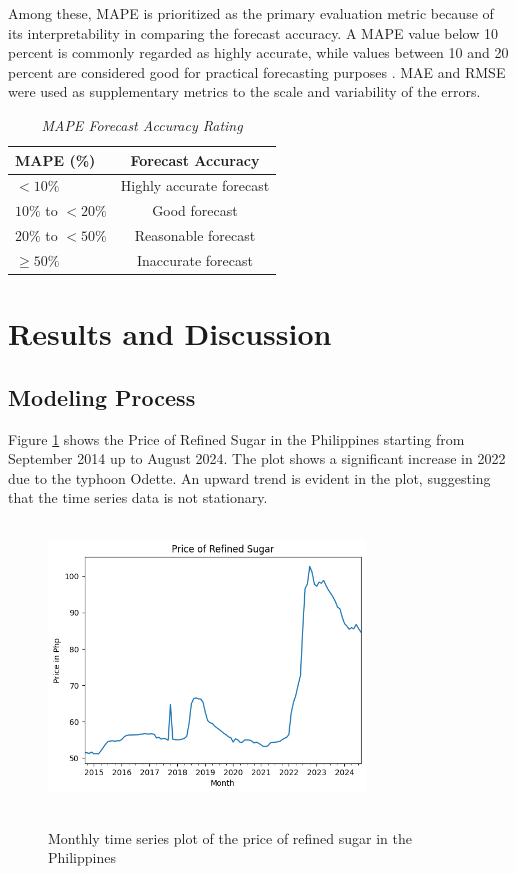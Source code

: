 \documentclass[11pt]{article}
\begin{document}
Among these, MAPE is prioritized as the primary evaluation metric because of its interpretability in comparing the forecast accuracy. A MAPE value below 10 percent is commonly regarded as highly accurate, while values between 10 and 20 percent are considered good for practical forecasting purposes \citep{lewis}. MAE and RMSE were used as supplementary metrics to the scale and variability of the errors. 


\begin{table}[H]
    \caption{\textit{MAPE Forecast Accuracy Rating \citep{lewis}}}
    \label{lewis}
    \centering
    \begin{tabular}{lc}
        \toprule
        MAPE (\%) & Forecast Accuracy \\
        \midrule
        $< 10\%$ & Highly accurate forecast \\
        $10\%$ to $<20\%$ & Good forecast \\
        $20\%$ to $< 50\%$ & Reasonable forecast \\
        $\ge 50\%$ & Inaccurate forecast \\
        \bottomrule
    \end{tabular}
\end{table}

\section{Results and Discussion}

\subsection{Modeling Process}

Figure \ref{price_plot} shows the Price of Refined Sugar in the Philippines starting from September 2014 up to August 2024. The plot shows a significant increase in 2022 due to the typhoon Odette. An upward trend is evident in the plot, suggesting that the time series data is not stationary. 
\begin{figure}[h]
        \caption{Monthly time series plot of the price of refined sugar in the Philippines}
        \centering
        \includegraphics[width=0.75\textwidth, height = 3in]{Price_plot.png}
        \label{price_plot}
\end{figure}
    
\end{document}
